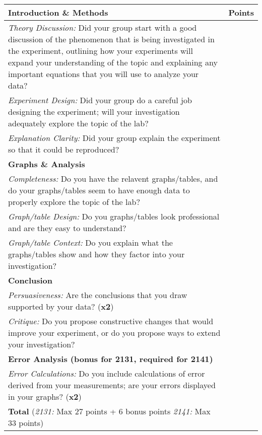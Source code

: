 \begin{table}[h]
	\centering
	\begin{tabular}{|p{13cm}|c|}
	\hline
	\textbf{Introduction \& Methods} & \textbf{Points} \\
	\hline
	\emph{Theory Discussion:} Did your group start with a good discussion of the phenomenon that is being investigated in the experiment, outlining how your experiments will expand your understanding of the topic and explaining any important equations that you will use to analyze your data? & \\
	\hline
	\emph{Experiment Design:} Did your group do a careful job designing the experiment; will your investigation adequately explore the topic of the lab? &  \\
	\hline
	\emph{Explanation Clarity:} Did your group explain the experiment so that it could be reproduced? &  \\
	\hline
	\textbf{Graphs \& Analysis} &  \\
	\hline
	\emph{Completeness:} Do you have the relavent graphs/tables, and do your graphs/tables seem to have enough data to properly explore the topic of the lab?  &  \\
	\hline
	\emph{Graph/table Design:} Do you graphs/tables look professional and are they easy to understand? &  \\
	\hline
	\emph{Graph/table Context:} Do you explain what the graphs/tables show and how they factor into your investigation? &  \\
	\hline
	\textbf{Conclusion} &  \\
	\hline
	\emph{Persuasiveness:} Are the conclusions that you draw supported by your data? (\textbf{x2}) &  \\
	\hline
	\emph{Critique:} Do you propose constructive changes that would improve your experiment, or do you propose ways to extend your investigation? &  \\
	\hline
	\textbf{Error Analysis (bonus for 2131, required for 2141)} &  \\
	\hline
	\emph{Error Calculations:} Do you include calculations of error derived from your measurements; are your errors displayed in your graphs? (\textbf{x2}) &  \\
	\hline
	\textbf{Total} (\emph{2131:} Max 27 points + 6 bonus points \textbar \emph{2141:} Max 33 points) &  \\
	\hline
	\end{tabular}
\end{table}

